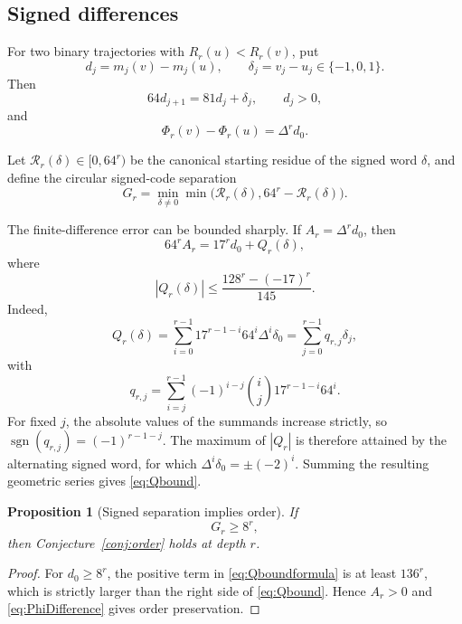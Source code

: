 \documentclass[11pt,reqno]{amsart}
\numberwithin{equation}{section}
\newtheorem{proposition}[theorem]{Proposition}
\theoremstyle{definition}
\theoremstyle{remark}
\begin{document}
\subsection{Signed differences}

For two binary trajectories with $R_r(u)<R_r(v)$, put
\[
 d_j=m_j(v)-m_j(u),
 \qquad
 \delta_j=v_j-u_j\in\{-1,0,1\}.
\]
Then
\begin{equation}\label{eq:signedrec}
 64d_{j+1}=81d_j+\delta_j,
 \qquad d_j>0,
\end{equation}
and
\begin{equation}\label{eq:PhiDifference}
 \Phi_r(v)-\Phi_r(u)=\Delta^r d_0.
\end{equation}

Let $\mathscr R_r(\delta)\in[0,64^r)$ be the canonical starting residue of the signed word $\delta$, and define the circular signed-code separation
\begin{equation}\label{eq:Gr}
 G_r=
 \min_{\delta\ne0}
 \min\bigl(\mathscr R_r(\delta),
           64^r-\mathscr R_r(\delta)\bigr).
\end{equation}

The finite-difference error can be bounded sharply.  If $A_r=\Delta^r d_0$, then
\begin{equation}\label{eq:Qboundformula}
 64^rA_r=17^rd_0+Q_r(\delta),
\end{equation}
where
\begin{equation}\label{eq:Qbound}
 |Q_r(\delta)|
 \le
 \frac{128^r-(-17)^r}{145}.
\end{equation}
Indeed,
\[
 Q_r(\delta)=\sum_{i=0}^{r-1}17^{r-1-i}64^i\Delta^i\delta_0
 =\sum_{j=0}^{r-1}q_{r,j}\delta_j,
\]
with
\[
 q_{r,j}=\sum_{i=j}^{r-1}(-1)^{i-j}
 \binom ij17^{r-1-i}64^i.
\]
For fixed $j$, the absolute values of the summands increase strictly, so
$\operatorname{sgn}(q_{r,j})=(-1)^{r-1-j}$.  The maximum of
$|Q_r|$ is therefore attained by the alternating signed word, for which
$\Delta^i\delta_0=\pm(-2)^i$.  Summing the resulting geometric series gives
\eqref{eq:Qbound}.

\begin{proposition}[Signed separation implies order]\label{prop:Gorder}
If
\[
 G_r\ge8^r,
\]
then Conjecture~\ref{conj:order} holds at depth $r$.
\end{proposition}

\begin{proof}
For $d_0\ge8^r$, the positive term in \eqref{eq:Qboundformula} is at least $136^r$, which is strictly larger than the right side of \eqref{eq:Qbound}.  Hence $A_r>0$ and \eqref{eq:PhiDifference} gives order preservation.
\end{proof}
\end{document}
